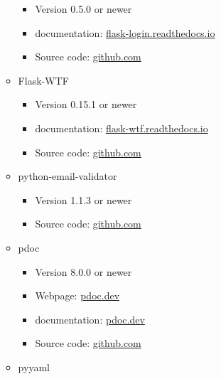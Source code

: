 \documentclass{scrreprt}
\begin{document}
\begin{itemize}
\begin{itemize}
\begin{itemize}
        	\item Version 0.5.0 or newer
        	\item \Gls{documentation}: \href{https://flask-login.readthedocs.io/en/latest/}{flask-login.readthedocs.io}
        	\item Source code: \href{https://github.com/maxcountryman/flask-login}{github.com}
        
        \end{itemize}
        
        \item \Gls{Flask}-WTF
        \begin{itemize}
        
        	\item Version 0.15.1 or newer
        	\item \Gls{documentation}: \href{https://flask-wtf.readthedocs.io/en/0.15.x/}{flask-wtf.readthedocs.io}
        	\item Source code: \href{https://github.com/wtforms/flask-wtf}{github.com}
        
        \end{itemize}
        
        \item python-email-validator
        \begin{itemize}
        
        	\item Version 1.1.3 or newer
        	\item Source code: \href{https://github.com/JoshData/python-email-validator}{github.com}
        
        \end{itemize}
        
        \item pdoc
        \begin{itemize}

            \item Version 8.0.0 or newer
            \item Webpage: \href{https://pdoc.dev/}{pdoc.dev}
            \item \Gls{documentation}: \href{https://pdoc.dev/docs/pdoc.html}{pdoc.dev}
            \item Source code: \href{https://github.com/mitmproxy/pdoc}{github.com} 

        \end{itemize}
        
        \item pyyaml
        \begin{itemize}
        

\end{itemize}
\end{itemize}
\end{itemize}
\end{document}

